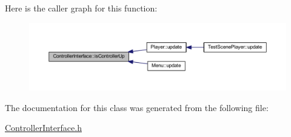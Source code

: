 Here is the caller graph for this function:
\nopagebreak
\begin{figure}[H]
\begin{center}
\leavevmode
\includegraphics[width=400pt]{de/d7f/class_controller_interface_a1a139422246c70afd79c9c575643da9e_icgraph}
\end{center}
\end{figure}




The documentation for this class was generated from the following file:\begin{DoxyCompactItemize}
\item 
\hyperlink{_controller_interface_8h}{ControllerInterface.h}\end{DoxyCompactItemize}
